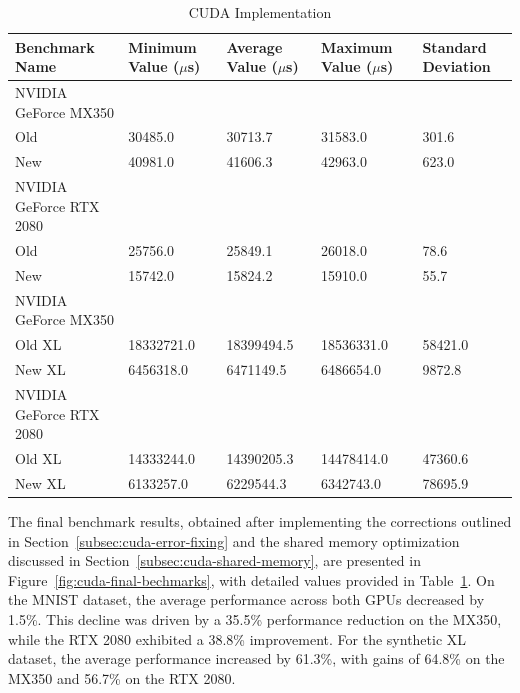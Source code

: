 \documentclass[modern,longauthor]{aastex7}
\begin{document}
\begin{table}[htb!]
\centering
\caption{CUDA Implementation\label{tab:cuda-final-benchmarks}}
\begin{tabular}{p{5.5cm} p{2cm} p{2cm} p{2cm} p{2cm}}
\hline
Benchmark Name & Minimum Value ($\mu$s) & Average Value ($\mu$s) & Maximum Value ($\mu$s) & Standard Deviation \\
\hline
NVIDIA GeForce MX350 \\
\hspace{0.5cm}Old & 30485.0 & 30713.7 & 31583.0 & 301.6 \\
\hspace{0.5cm}New & 40981.0 & 41606.3 & 42963.0 & 623.0 \\
NVIDIA GeForce RTX 2080 \\
\hspace{0.5cm}Old & 25756.0 & 25849.1 & 26018.0 & 78.6 \\
\hspace{0.5cm}New & 15742.0 & 15824.2 & 15910.0 & 55.7 \\
\hline
NVIDIA GeForce MX350 \\
\hspace{0.5cm}Old XL & 18332721.0 & 18399494.5 & 18536331.0 & 58421.0 \\
\hspace{0.5cm}New XL & 6456318.0 & 6471149.5 & 6486654.0 & 9872.8 \\
NVIDIA GeForce RTX 2080 \\
\hspace{0.5cm}Old XL & 14333244.0 & 14390205.3 & 14478414.0 & 47360.6 \\
\hspace{0.5cm}New XL & 6133257.0 & 6229544.3 & 6342743.0 & 78695.9 \\
\hline
\end{tabular}
\end{table}
\FloatBarrier

The final benchmark results, obtained after implementing the corrections outlined in Section~\ref{subsec:cuda-error-fixing} and the shared memory optimization discussed in Section~\ref{subsec:cuda-shared-memory}, are presented in Figure~\ref{fig:cuda-final-bechmarks}, with detailed values provided in Table~\ref{tab:cuda-final-benchmarks}. On the MNIST dataset, the average performance across both GPUs decreased by 1.5\%. This decline was driven by a 35.5\% performance reduction on the MX350, while the RTX 2080 exhibited a 38.8\% improvement. For the synthetic XL dataset, the average performance increased by 61.3\%, with gains of 64.8\% on the MX350 and 56.7\% on the RTX 2080.
\end{document}
